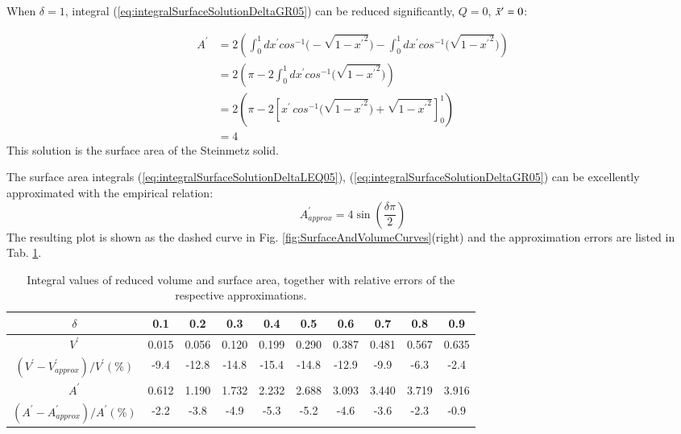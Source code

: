\documentclass[authoryear]{elsarticle}
\begin{document}
    When $\delta=1$, integral (\ref{eq:integralSurfaceSolutionDeltaGR05}) can be reduced significantly, $Q=0$, $\Tilde{x}^\prime=0$:
    
    \begin{align*}
        A^\prime &=
      2 \left( \int_0^1 dx^\prime cos^{-1} \Big( - \sqrt{ 1-{x^\prime}^2 }\Big) - 
    \int_{0}^1 dx^\prime cos^{-1} \Big( \sqrt{ 1-{x^\prime}^2 }\Big) \right)\\
    &= 2 \left( \pi - 2 \int_{0}^1 dx^\prime cos^{-1} \Big( \sqrt{ 1-{x^\prime}^2 }\Big) \right)\\
    &= 2 \left( \pi - 2 \left[ x^\prime \, cos^{-1} \Big( \sqrt{ 1-{x^\prime}^2 }\Big)    + \sqrt{ 1-{x^\prime}^2} \right]_0^1 \right)\\
    &=4
    \end{align*}
    This solution is the surface area of the Steinmetz solid.

    The surface area integrals (\ref{eq:integralSurfaceSolutionDeltaLEQ05}), (\ref{eq:integralSurfaceSolutionDeltaGR05}) can be excellently approximated with the empirical relation:
    \begin{equation}
        A^\prime_{approx} = 4 \sin\left( \frac{\delta \pi}{2}  \right)
    \end{equation}
    The resulting plot is shown as the dashed curve in Fig. \ref{fig:SurfaceAndVolumeCurves}(right) and the approximation errors are listed in Tab. \ref{tab:integralSolutionTable}.
    

    \begin{table}[H]
    \centering
    \begin{tabular}{cccccccccc}
    \hline
    $\delta$ & 0.1 & 0.2 & 0.3 & 0.4 & 0.5 & 0.6 & 0.7 & 0.8 & 0.9   \\
    \hline
    $V^\prime$  & 0.015 & 0.056 & 0.120 & 0.199 & 0.290 & 0.387 & 0.481 & 0.567 & 0.635   \\
    $(V^\prime - V^\prime_{approx})/V^\prime  (\%) $  & -9.4 & -12.8 & -14.8 & -15.4 & -14.8 & -12.9 & -9.9 & -6.3 & -2.4 \\
    $A^\prime$ & 0.612 & 1.190 & 1.732 & 2.232 & 2.688 & 3.093 & 3.440 & 3.719 & 3.916  \\
    $(A^\prime - A^\prime_{approx})/A^\prime (\%) $  
    & -2.2 & -3.8 & -4.9 & -5.3 & -5.2 & -4.6 & -3.6 & -2.3 & -0.9  \\
     \hline
    \end{tabular}
    \caption{Integral values of reduced volume and surface area, together with relative errors of the respective approximations.}\label{tab:integralSolutionTable}
    \end{table}
\end{document}
